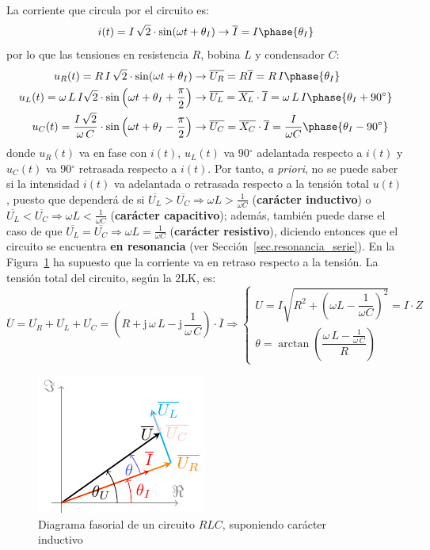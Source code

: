 \documentclass[11pt]{book} %
\begin{document}
	La corriente que circula por el circuito es:
	\begin{equation*}
		i(t)=I\,\sqrt{2}\cdot\sin(\omega t+\theta_I)\rightarrow\overline{I}=I\phase{\theta_I}
	\end{equation*}
	por lo que las tensiones en resistencia $R$, bobina $L$ y condensador $C$:
	\begin{align*}
		u_R(t)=R\, I\,\sqrt{2}\cdot\sin(\omega t+\theta_I)&\rightarrow \overline{U_R} = R \overline{I}=R\,I\phase{\theta_I}\\ 
		u_L(t)= \omega\,L\,I \sqrt{2}\cdot \sin \left(\omega t+\theta_I+\frac{\pi}{2}\right)&\rightarrow \overline{U_L}=\overline{X_L}\cdot\overline{I}= \omega\,L\,I\phase{\theta_I+90^\circ}\\
		u_C(t)=\dfrac{I\,\sqrt{2}}{\omega\,C} \cdot \sin \left(\omega t+\theta_I-\frac{\pi}{2}\right)&\rightarrow \overline{U_C}=\overline{X_C}\cdot\overline{I}=\dfrac{I}{\omega C}\phase{\theta_I-90^\circ}
	\end{align*}
	donde $u_R(t)$ va en fase con $i(t)$, $u_L(t)$ va 90$^\circ$ adelantada respecto a $i(t)$ y $u_C(t)$ va 90$^\circ$ retrasada respecto a $i(t)$. Por tanto, \textit{a priori}, no se puede saber si la intensidad $i(t)$ va {adelantada o retrasada} respecto a la tensión total $u(t)$, puesto que dependerá de si $\overline{U_L}>\overline{U_C}\Rightarrow \omega L>\frac{1}{\omega C}$ (\textbf{carácter inductivo}) o $\overline{U_L}<\overline{U_C}\Rightarrow \omega L<\frac{1}{\omega C}$ (\textbf{carácter capacitivo}); además, también puede darse el caso de que $\overline{U_L}=\overline{U_C}\Rightarrow \omega L=\frac{1}{\omega C}$ (\textbf{carácter resistivo}), diciendo entonces que el circuito se encuentra \textbf{en resonancia} (ver Sección~\ref{sec.resonancia_serie}). En la Figura~\ref{fig.fasorRLC_VI} ha supuesto que la corriente va en retraso respecto a la tensión. La tensión total del circuito, según la 2LK, es:  
	\begin{equation*}
		\overline{U} = \overline{U_R} +\overline{U_L} + \overline{U_C} =\left(R+\mathrm{j}\,\omega\,L - \mathrm{j}\,\dfrac{1}{\omega\,C}\right) \cdot \overline{I}\Rightarrow 
		\begin{cases}
			U=I\sqrt{R^2 + \left(\omega L - \dfrac{1}{\omega C}\right)^2}=I\cdot Z\\
			\theta=\arctan\left( \dfrac{\omega\,L-\frac{1}{\omega\,C}}{R}\right)
		\end{cases}
	\end{equation*}
	
	\begin{figure}[htbp]
		\centering \includegraphics[width=0.3\linewidth]{../figs/fasorRLC_VI.pdf}
		\caption{Diagrama fasorial de un circuito $RLC$, suponiendo carácter inductivo}
		\label{fig.fasorRLC_VI}
	\end{figure}
	
\end{document}
